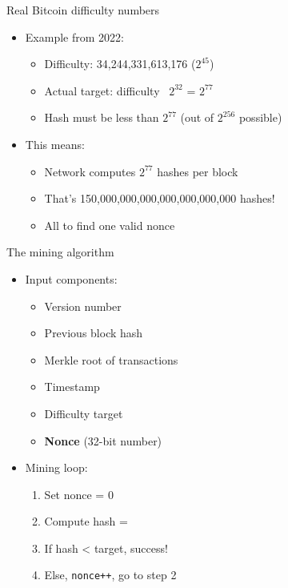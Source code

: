 \documentclass[aspectratio=169, lualatex, handout]{beamer}
\begin{document}
\begin{frame}{Real Bitcoin difficulty numbers}
	\begin{itemize}
		\item Example from 2022:
		      \begin{itemize}
			      \item Difficulty: 34,244,331,613,176 (\approx$2^{45}$)
			      \item Actual target: difficulty \times\ $2^{32}$ = $2^{77}$
			      \item Hash must be less than $2^{77}$ (out of $2^{256}$ possible)
		      \end{itemize}
		\item This means:
		      \begin{itemize}
			      \item Network computes \approx$2^{77}$ hashes per block
			      \item That's 150,000,000,000,000,000,000,000 hashes!
			      \item All to find one valid nonce
		      \end{itemize}
	\end{itemize}
\end{frame}

\begin{frame}{The mining algorithm}
	\begin{itemize}
		\item Input components:
		      \begin{itemize}
			      \item Version number
			      \item Previous block hash
			      \item Merkle root of transactions
			      \item Timestamp
			      \item Difficulty target
			      \item \textbf{Nonce} (32-bit number)
		      \end{itemize}
		\item Mining loop:
		      \begin{enumerate}
			      \item Set nonce = 0
			      \item Compute hash = 
			      \item If hash < target, success!
			      \item Else, \texttt{nonce++}, go to step 2
		      \end{enumerate}
	\end{itemize}
\end{frame}
\end{document}
